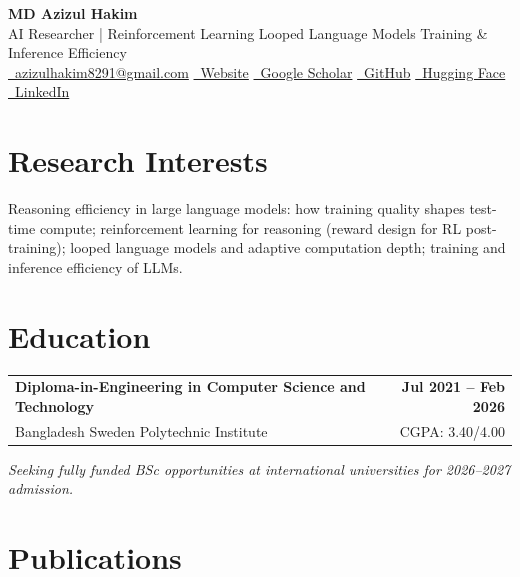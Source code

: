 \documentclass[10pt, a4paper]{article}
\begin{document}
\begin{center}
  {\huge\bfseries\color{headblue} MD Azizul Hakim}\\[1pt]
  {\small AI Researcher \;|\; Reinforcement Learning \textbullet{} Looped Language Models \textbullet{} Training \& Inference Efficiency}\\[5pt]

  \small
  \href{mailto:azizulhakim8291@gmail.com}{\faEnvelope\ azizulhakim8291@gmail.com}
  \quad
  \href{https://logicsame.github.io/md-hakim.github.io/}{\faGlobe\ Website}
  \quad
  \href{https://scholar.google.com/citations?user=jVyIovcAAAAJ&hl=en}{\faGraduationCap\ Google Scholar}
  \quad
  \href{https://github.com/logicsame}{\faGithub\ GitHub}
  \quad
  \href{https://huggingface.co/Md-Hakim}{\faCube\ Hugging Face}
  \quad
  \href{https://www.linkedin.com/in/md-azizul-hakim-0b2635359/}{\faLinkedin\ LinkedIn}
\end{center}

\section{Research Interests}
Reasoning efficiency in large language models: how training quality shapes test-time compute;
reinforcement learning for reasoning (reward design for RL post-training);
looped language models and adaptive computation depth;
training and inference efficiency of LLMs.

\section{Education}

\noindent
\begin{tabularx}{\textwidth}{@{}X r@{}}
  \textbf{Diploma-in-Engineering in Computer Science and Technology} & \textbf{Jul 2021 -- Feb 2026}\\
  Bangladesh Sweden Polytechnic Institute & CGPA: 3.40/4.00\\
\end{tabularx}

\smallskip
\noindent
\textit{Seeking fully funded BSc opportunities at international universities for 2026--2027 admission.}

\section{Publications}
\end{document}
